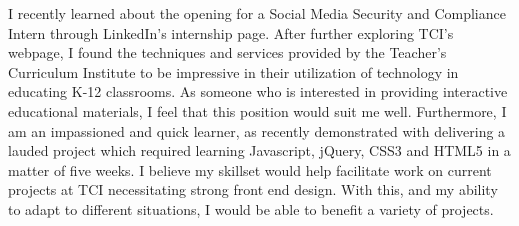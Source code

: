 \documentclass[]{./friggeri-coverletter}
\begin{document}


\begin{bp}
I recently learned about the opening for a Social Media Security and Compliance
Intern through LinkedIn's internship page. After further exploring
TCI's webpage, I found the techniques and services provided by the Teacher's
Curriculum Institute to be impressive in their utilization of technology in
educating K-12 classrooms. As someone who is interested in providing
interactive educational materials, I feel that this position would suit me
well. Furthermore, I am an impassioned and quick learner, as recently
demonstrated with delivering a lauded project which required learning
Javascript, jQuery, CSS3 and HTML5 in a matter of five weeks.
I believe my skillset would help facilitate work on current projects at TCI
necessitating strong front end design. With this, and my ability to adapt to
different situations, I would be able to benefit a variety of projects.
\end{bp}%
%
\end{document}
